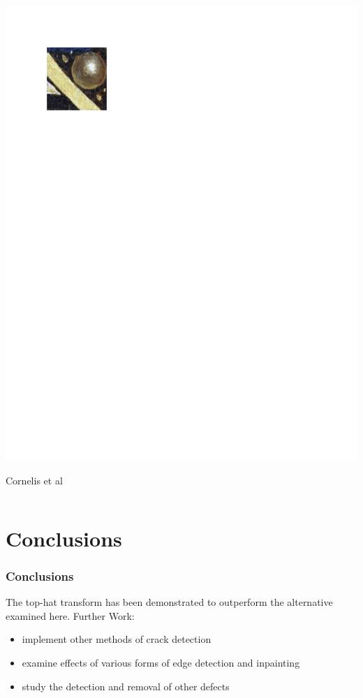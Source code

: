 \documentclass{beamer}
\begin{document}
\begin{frame}
\begin{columns}
\begin{column}{0.5\textwidth}
\includegraphics[width=1\textwidth,trim={0.5in 8.4in 5.5in 0.75in},clip]{ghent_altarpiece_restored}
\begin{center}
\tiny Cornelis et al
\end{center}
\end{column}
\end{columns}
\end{frame}

\section[Conclusions]{Conclusions}

\begin{frame}
\frametitle[Conclusions]{Conclusions}
The top-hat transform has been demonstrated to outperform the alternative examined here.
\linebreak
\linebreak
\linebreak
Further Work:
\begin{itemize}
\item implement other methods of crack detection
\item examine effects of various forms of edge detection and inpainting
\item study the detection and removal of other defects
\end{itemize}
\end{frame}
\end{document}

